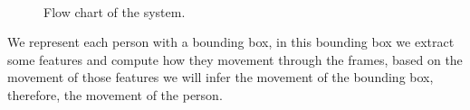 \begin{figure}[H]
	
\centering

\\


\caption{Flow chart of the system.}
\label{introTracking3}
\end{figure}

We represent each person with a bounding box, in this bounding box we extract some features and compute how they movement through the frames, based on the movement of those features we will infer the movement of the bounding box, therefore, the movement of the person.


